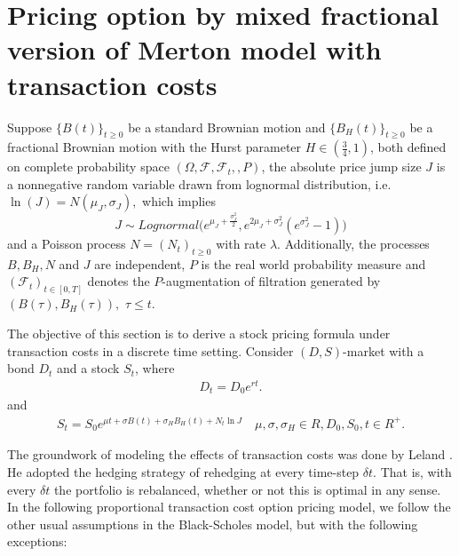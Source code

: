 \documentclass[a4paper,11pt]{amsart}
\numberwithin{equation}{section}
\theoremstyle{definition}
\theoremstyle{plain}
\theoremstyle{definition}
\newcommand{\1}{\mathbf{1}}
\begin{document}
\section{Pricing option by mixed fractional version of Merton model with transaction costs}\label{sec:2}
Suppose $\{B(t)\}_{t\geq0}$ be a standard Brownian motion and $\{B_H(t)\}_{t\geq0}$ be a fractional Brownian motion with the Hurst parameter $H\in(\frac{3}{4},1)$, both defined on complete probability space $(\Omega,\mathcal{F},\mathcal{F}_t,,P)$, the absolute price jump size $J$ is a nonnegative random variable drawn from lognormal distribution, i.e. $\ln(J)=N(\mu_J,\sigma_J),$ which implies $$
J\sim Lognormal \Big(e^{\mu_J+\frac{\sigma_J^2}{2}},e^{2\mu_J+\sigma_J^2}(e^{\sigma_J^2}-1)\Big)$$ and a Poisson process $N=(N_t)_{t\geq0}$ with rate $\lambda$. Additionally, the processes $B, B_H, N$ and $J$ are independent, $P$ is the real world probability measure and  $(\mathcal{F}_t)_{t\in[0,T]}$ denotes the $P$-augmentation of filtration generated by $(B(\tau),B_H(\tau)),$ $\tau\leq t$.

The objective of this section is to derive a stock pricing formula under transaction costs in a discrete time setting. Consider $(D,S)$-market with a bond $D_t$ and a stock $S_t$, where
\begin{eqnarray}
D_t=D_0e^{rt}.
\label{eq:1-1}
\end{eqnarray}
and
\begin{eqnarray}
S_t=S_0e^{\mu t+\sigma B(t)+\sigma_HB_H(t)+N_t\ln J}\quad \mu, \sigma, \sigma_H\in R, D_0, S_0, t\in R^+ .
\label{eq:1-2}
\end{eqnarray}


The groundwork of modeling the effects of transaction costs was done by Leland \cite{leland}. He adopted the hedging strategy of
rehedging at every time-step $\delta t$. That is, with every $\delta t$ the portfolio is rebalanced, whether or not this is optimal in any sense. In the
following proportional transaction cost option pricing model, we follow the other usual assumptions in the Black-Scholes
model, but with the following exceptions:
\end{document}

